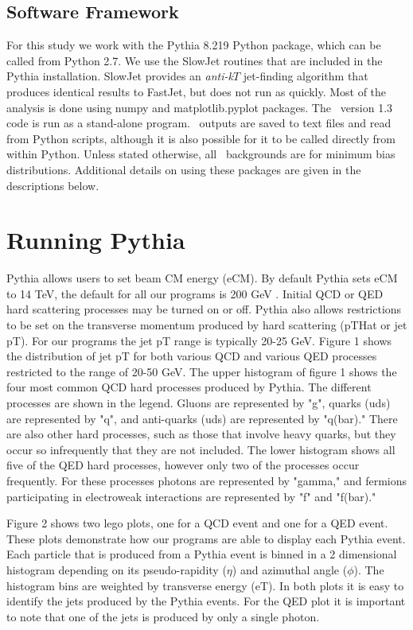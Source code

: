 \documentclass[11pt]{article}
\begin{document}
\subsection*{Software Framework}

For this study we work with the Pythia 8.219 Python package, which can be called from Python 2.7.  We use the SlowJet routines that are included in the Pythia installation.  SlowJet provides an {\it anti-k$T$} jet-finding algorithm that produces identical results to FastJet, but does not run as quickly.  Most of the analysis is done using numpy and matplotlib.pyplot packages.  The \trento\ version 1.3 code is run as a stand-alone program.  \trento\ outputs are saved to text files and read from Python scripts, although it is also possible for it to be called directly from within Python.  Unless stated otherwise, all \trento\ backgrounds are for minimum bias distributions.  Additional details on using these packages are given in the descriptions below.

\section{Running Pythia}
%
%
Pythia allows users to set beam CM energy (eCM). By default Pythia sets eCM to 14 TeV, the default for all our programs is 200 GeV .  Initial QCD or QED hard scattering processes may be turned on or off. Pythia also allows restrictions to be set on the transverse momentum produced by hard scattering (pTHat or jet pT). For our programs the jet pT range is typically 20-25 GeV. Figure 1 shows the distribution of jet pT for both various QCD and various QED processes restricted to the range of 20-50 GeV. The upper histogram of figure 1 shows the four most common QCD hard processes produced by Pythia. The different processes are shown in the legend. Gluons are represented by "g", quarks (uds) are represented by "q", and anti-quarks (uds) are represented by "q(bar)." There are also other hard processes, such as those that involve heavy quarks, but they occur so infrequently that they are not included. The lower histogram shows all five of the QED hard processes, however only two of the processes occur frequently. For these processes photons are represented by "gamma," and fermions participating in electroweak interactions are represented by "f" and "f(bar)."

Figure 2 shows two lego plots, one for a QCD event and one for a QED event. These plots demonstrate how our programs are able to display each Pythia event. Each particle that is produced from a Pythia event is binned in a 2 dimensional histogram depending on its pseudo-rapidity ($\eta$) and azimuthal angle ($\phi$). The histogram bins are weighted by transverse energy (eT). In both plots it is easy to identify the jets produced by the Pythia events. For the QED plot it is important to note that one of the jets is produced by only a single photon. 
\end{document}
